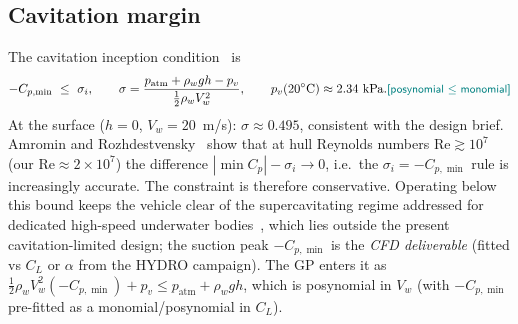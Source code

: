 \documentclass[conf]{new-aiaa}
\newcommand{\gpc}[1]{\textcolor{teal}{\small\textsf{[#1]}}} %
\begin{document}
\subsection{Cavitation margin}\label{sec:cavitation}
The cavitation inception condition~\cite{brennen2014cavitation} is
\begin{equation}
-C_{p,\min}\ \le\ \sigma_i,
\qquad \sigma = \frac{p_{\text{atm}} + \rho_w g h - p_v}{\tfrac12\rho_w V_w^2},
\qquad p_v(20^\circ\text{C})\approx 2.34\ \text{kPa}.
\gpc{posynomial $\le$ monomial}
\end{equation}
At the surface ($h=0$, $V_w=20$~m/s): $\sigma\approx0.495$, consistent with
the design brief. Amromin and Rozhdestvensky~\cite{amromin2022cavitation} show that at hull Reynolds
numbers $\mathrm{Re}\gtrsim10^7$ (our $\mathrm{Re}\approx2\times10^7$) the difference
$|\min C_p|-\sigma_i\to0$, i.e.\ the $\sigma_i=-C_{p,\min}$ rule is increasingly accurate. The
constraint is therefore conservative. Operating below this bound keeps the vehicle clear of the supercavitating regime addressed for dedicated high-speed underwater bodies~\cite{dzielski2003benchmark,zou2023optimized}, which lies outside the present cavitation-limited design; the suction peak $-C_{p,\min}$ is the \emph{CFD deliverable}
(fitted vs $C_L$ or $\alpha$ from the HYDRO campaign). The GP enters it as
$\tfrac12\rho_w V_w^2(-C_{p,\min})+p_v\le p_{\text{atm}}+\rho_w g h$, which is posynomial in $V_w$
(with $-C_{p,\min}$ pre-fitted as a monomial/posynomial in $C_L$).
\end{document}
